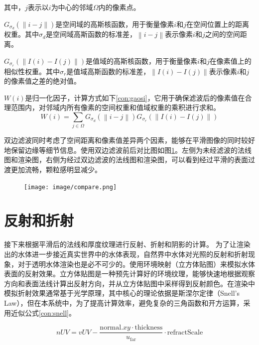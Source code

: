 其中，$j$表示以$i$为中心的邻域$\Omega$内的像素点。

$G_{\sigma_d}(\left \| i - j \right \|)$是空间域的高斯核函数，用于衡量像素$i$和$j$在空间位置上的距离权重。其中$\sigma_d$是空间域高斯函数的标准差，$\left \| i - j \right \|$表示像素$i$和$j$之间的空间距离。

$G_{\sigma_r}(\left \| I(i)-I(j) \right \|)$是值域的高斯核函数，用于衡量像素$i$和$j$在像素值上的相似性权重。其中$\sigma_r$是值域高斯函数的标准差，$\left \| I(i)-I(j) \right \|$表示像素$i$和$j$的像素值之差的绝对值。

$W(i)$是归一化因子，计算方式如下\ref{con:gaosi}，它用于确保滤波后的像素值在合理范围内，对邻域内所有像素的空间权重和值域权重的乘积进行求和。
\begin{equation}
    W(i)=\sum_{j\in\Omega}G_{\sigma_d}(\left \| i - j \right \|)G_{\sigma_r}(\left \| I(i)-I(j) \right \|)
    \label{con:gaosi}
\end{equation}

双边滤波同时考虑了空间距离和像素值差异两个因素，能够在平滑图像的同时较好地保留边缘等细节信息。使用双边滤波前后对比图如图\ref{fig:compare}。左侧为未经滤波的法线图和渲染图，右侧为经过双边滤波的法线图和渲染图，可以看到经过平滑的表面过渡更加流畅，颗粒感明显减少。

\begin{figure}[ht]
    \centering
    \texttt{[image: image/compare.png]}
    \label{fig:compare}
\end{figure}

\section{反射和折射}
接下来根据平滑后的法线和厚度纹理进行反射、折射和阴影的计算。
为了让渲染出的水体进一步接近真实世界中的水体表现，自然界中水体对光照的反射和折射现象，对于透明水体渲染也是必不可少的。使用环境映射（立方体贴图）来模拟水体表面的反射效果。立方体贴图是一种预先计算好的环境纹理，能够快速地根据观察方向和表面法线计算出反射方向，并从立方体贴图中采样得到反射颜色。在渲染中模拟折射效果通常基于光学原理，其中核心的理论依据是斯涅尔定律（Snell's Law），但在本系统中，为了提高计算效率，避免复杂的三角函数和开方运算，采用近似公式\ref{con:snell}。

\begin{equation}
    nUV = vUV - \frac{\text{normal}.xy \cdot \text{thickness}}{u_{\text{far}}} \cdot \text{refractScale}
    \label{con:snell}
\end{equation}

